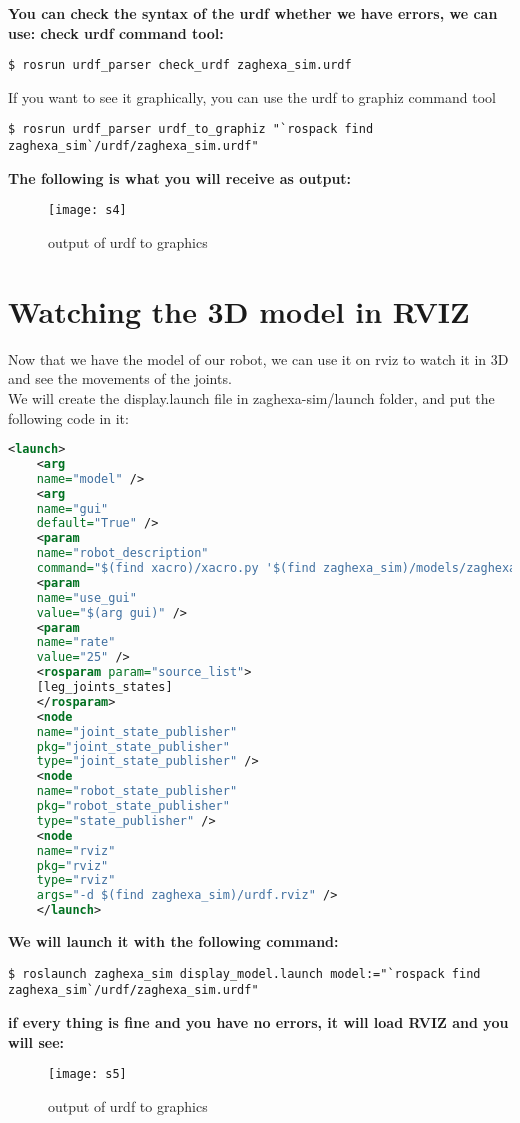\textbf{You can check the syntax of the urdf whether we have errors, we can use:
check urdf command tool:}
\begin{lstlisting}[language=terCmd]
$ rosrun urdf_parser check_urdf zaghexa_sim.urdf
\end{lstlisting}

If you want to see it graphically, you can use the urdf to graphiz command tool
\begin{lstlisting}[language=terCmd]
$ rosrun urdf_parser urdf_to_graphiz "`rospack find zaghexa_sim`/urdf/zaghexa_sim.urdf"
\end{lstlisting}
\textbf{The following is what you will receive as output:}
\begin{figure}[hbt]
    \centering
    \texttt{[image: s4]}
    \caption{output of urdf to graphics}
    \label{figure :s4}
\end{figure}

\section{Watching the 3D model in RVIZ}
Now that we have the model of our robot, we can use it on rviz to watch it in 3D
and see the movements of the joints.\\
We will create the display.launch file in zaghexa-sim/launch folder,
and put the following code in it:
\begin{lstlisting}[language=XML]
	<launch>
	<arg
	name="model" />
	<arg
	name="gui"
	default="True" />
	<param
	name="robot_description"
	command="$(find xacro)/xacro.py '$(find zaghexa_sim)/models/zaghexa_model.xacro'" />
	<param
	name="use_gui"
	value="$(arg gui)" />
	<param
	name="rate"
	value="25" />
	<rosparam param="source_list">
	[leg_joints_states]
	</rosparam>
	<node
	name="joint_state_publisher"
	pkg="joint_state_publisher"
	type="joint_state_publisher" />
	<node
	name="robot_state_publisher"
	pkg="robot_state_publisher"
	type="state_publisher" />
	<node
	name="rviz"
	pkg="rviz"
	type="rviz"
	args="-d $(find zaghexa_sim)/urdf.rviz" />
	</launch>
\end{lstlisting}	
\textbf{We will launch it with the following command:}
\begin{lstlisting}[language=terCmd]
$ roslaunch zaghexa_sim display_model.launch model:="`rospack find zaghexa_sim`/urdf/zaghexa_sim.urdf"
\end{lstlisting}

\textbf{if every thing is fine and you have no errors, it will load RVIZ and you will see:}
\begin{figure}[h]
	\centering
	\texttt{[image: s5]}
	\caption{output of urdf to graphics}
	\label{figure :s5}
\end{figure}

